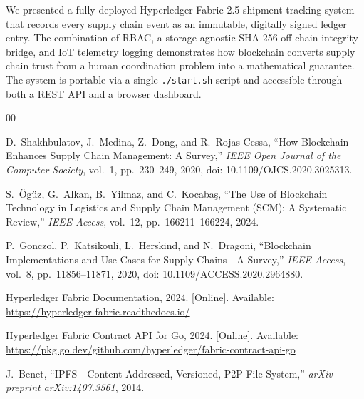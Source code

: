 \documentclass[conference]{IEEEtran}
\begin{document}
We presented a fully deployed Hyperledger Fabric 2.5 shipment tracking
system that records every supply chain event as an immutable, digitally
signed ledger entry.  The combination of RBAC, a storage-agnostic SHA-256
off-chain integrity bridge, and IoT telemetry logging demonstrates how
blockchain converts supply chain trust from a human coordination problem
into a mathematical guarantee.  The system is portable via a single
\texttt{./start.sh} script and accessible through both a REST API and a
browser dashboard.

\begin{thebibliography}{00}

D.~Shakhbulatov, J.~Medina, Z.~Dong, and R.~Rojas-Cessa,
``How Blockchain Enhances Supply Chain Management: A Survey,''
\textit{IEEE Open Journal of the Computer Society}, vol.~1, pp.~230--249, 2020,
doi: 10.1109/OJCS.2020.3025313.

S.~\"{O}g\"{u}z, G.~Alkan, B.~Yilmaz, and C.~Kocaba\c{s},
``The Use of Blockchain Technology in Logistics and Supply Chain
Management (SCM): A Systematic Review,''
\textit{IEEE Access}, vol.~12, pp.~166211--166224, 2024.

P.~Gonczol, P.~Katsikouli, L.~Herskind, and N.~Dragoni,
``Blockchain Implementations and Use Cases for Supply Chains---A Survey,''
\textit{IEEE Access}, vol.~8, pp.~11856--11871, 2020,
doi: 10.1109/ACCESS.2020.2964880.

Hyperledger Fabric Documentation, 2024.
[Online]. Available: \url{https://hyperledger-fabric.readthedocs.io/}

Hyperledger Fabric Contract API for Go, 2024.
[Online]. Available: \url{https://pkg.go.dev/github.com/hyperledger/fabric-contract-api-go}

J.~Benet,
``IPFS---Content Addressed, Versioned, P2P File System,''
\textit{arXiv preprint arXiv:1407.3561}, 2014.

\end{thebibliography}
\end{document}
